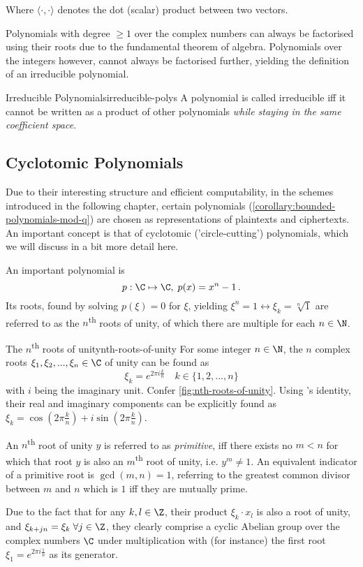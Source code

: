 Where $\langle \cdot, \cdot \rangle$ denotes the dot (scalar) product between two vectors.

Polynomials with degree $\geq 1$ over the complex numbers can always be factorised using their roots due to the fundamental theorem of algebra.
Polynomials over the integers however, cannot always be factorised further, yielding the definition of an irreducible polynomial.

\begin{definition}{Irreducible Polynomials}{irreducible-polys}
  A polynomial is called irreducible \gls{iff} it cannot be written as a product of other polynomials \textsl{while staying in the same coefficient space}.
\end{definition}

\subsection{Cyclotomic Polynomials}
Due to their interesting structure and efficient computability, in the schemes introduced in the following chapter, certain polynomials (\autoref{corollary:bounded-polynomials-mod-q}) are chosen as representations of plaintexts and ciphertexts.
An important concept is that of cyclotomic ('circle-cutting') polynomials, which we will discuss in a bit more detail here.

An important polynomial is $$p: \C \mapsto \C, \; p(x) = x^n - 1 \,.$$
Its roots, found by solving $p(\xi) = 0$ for $\xi$, yielding $\xi^n = 1 \leftrightarrow \xi_k = \sqrt[n]{1}$ are referred to as the $n$\textsuperscript{th} roots of unity, of which there are multiple for each $n \in \N$.

\begin{lemma}{The $n$\textsuperscript{th} roots of unity}{nth-roots-of-unity}
  For some integer $n \in \N$, the $n$ complex roots $\xi_1, \xi_2, ..., \xi_n \in \C$ of unity can be found as $$\xi_k = e^{2\pi i \frac{k}{n}} \quad k \in \{1, 2, ..., n\}$$ with $i$ being the imaginary unit.
  Confer \autoref{fig:nth-roots-of-unity}.
  Using 's identity, their real and imaginary components can be explicitly found as $\xi_k = \cos(2\pi \frac{k}{n}) + i \sin(2\pi \frac{k}{n})$.

  An $n$\textsuperscript{th} root of unity $y$ is referred to as \textit{primitive}, \gls{iff} there exists no $m < n$ for which that root $y$ is also an $m$\textsuperscript{th} root of unity, i.e. $y^m \neq 1$.
  An equivalent indicator of a primitive root is $\gcd(m, n) = 1$, referring to the greatest common divisor between $m$ and $n$ which is $1$ \gls{iff} they are mutually prime.
\end{lemma}
Due to the fact that for any $k, l \in \Z$, their product $\xi_k \cdot x_l$ is also a root of unity, and $\xi_{k+jn} = \xi_k \; \forall j \in \Z$, they clearly comprise a cyclic Abelian group over the complex numbers $\C$ under multiplication with (for instance) the first root $\xi_1 = e^{2\pi i \frac{1}{n}}$ as its generator.

